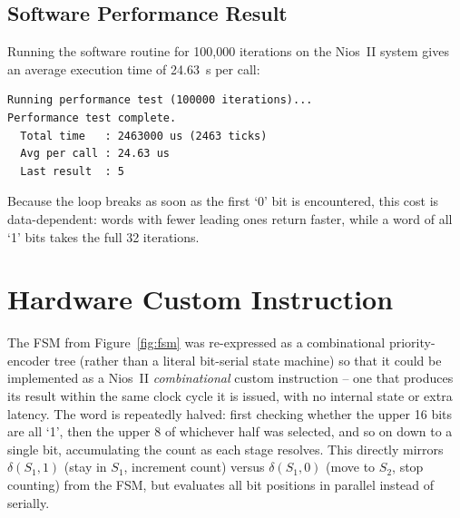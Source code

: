 \documentclass[
    12pt,
    a4paper
]{report}
\begin{document}
\subsection{Software Performance Result}

Running the software routine for 100{,}000 iterations on the Nios~II system gives an average
execution time of 24.63~\textmu s per call:

\begin{lstlisting}
Running performance test (100000 iterations)...
Performance test complete.
  Total time   : 2463000 us (2463 ticks)
  Avg per call : 24.63 us
  Last result  : 5
\end{lstlisting}

Because the loop breaks as soon as the first `0' bit is encountered, this cost is data-dependent:
words with fewer leading ones return faster, while a word of all `1' bits takes the full 32
iterations.

\section{Hardware Custom Instruction}
\label{sec:custom-instr-hw}

The FSM from Figure~\ref{fig:fsm} was re-expressed as a combinational priority-encoder tree
(rather than a literal bit-serial state machine) so that it could be implemented as a Nios~II
\emph{combinational} custom instruction -- one that produces its result within the same clock
cycle it is issued, with no internal state or extra latency. The word is repeatedly halved: first
checking whether the upper 16 bits are all `1', then the upper 8 of whichever half was selected,
and so on down to a single bit, accumulating the count as each stage resolves. This directly
mirrors $\delta(S_1, 1)$ (stay in $S_1$, increment count) versus $\delta(S_1, 0)$ (move to $S_2$,
stop counting) from the FSM, but evaluates all bit positions in parallel instead of serially.
\end{document}
